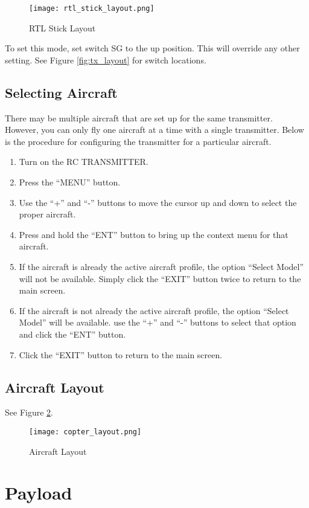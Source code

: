 \documentclass{report}
\begin{document}
					\begin{figure}[ht]
						\centering
						\caption{RTL Stick Layout}
						\texttt{[image: rtl\_stick\_layout.png]}
						\label{fig:rtl_sticks}
					\end{figure}

					To set this mode, set switch SG to the up position.  This will override any other setting.  See Figure \ref{fig:tx_layout} for switch locations.
			\subsection{Selecting Aircraft}
				There may be multiple aircraft that are set up for the same transmitter.  However, you can only fly one aircraft at a time with a single transmitter.  Below is the procedure for configuring the transmitter for a particular aircraft.
				\begin{enumerate}
					\item Turn on the RC TRANSMITTER.
					\item Press the ``MENU'' button.
					\item Use the ``+'' and ``-'' buttons to move the cursor up and down to select the proper aircraft.
					\item Press and hold the ``ENT'' button to bring up the context menu for that aircraft.
					\item If the aircraft is already the active aircraft profile, the option ``Select Model'' will not be available.  Simply click the ``EXIT'' button twice to return to the main screen.
					\item If the aircraft is not already the active aircraft profile, the option ``Select Model'' will be available.  use the ``+'' and ``-'' buttons to select that option and click the ``ENT'' button.
					\item Click the ``EXIT'' button to return to the main screen.
				\end{enumerate}
		\subsection{Aircraft Layout}
			See Figure \ref{fig:copter_layout}.
			\begin{figure}[ht]
				\centering
				\caption{Aircraft Layout}
				\texttt{[image: copter\_layout.png]}
				\label{fig:copter_layout}
			\end{figure}
	\section{Payload}
\end{document}
